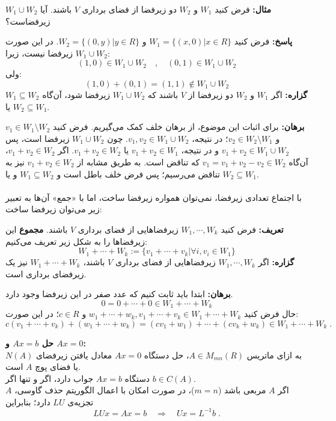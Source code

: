 \textbf{مثال:}
فرض کنید $W_{1}$ و $W_{2}$ دو زیر‌فضا از فضا‌ی برداری $V$ باشند. آیا $W_{1}\cup W_{2}$ زیر‌فضاست؟

\textbf{پاسخ:}
فرض کنید $W_{1} = \{(x,0)|x\in R\}$ و $W_{2} = \{(0,y)|y\in R\}$. در این صورت  $W_{1}\cup W_{2}$ زیر‌فضا نیست، زیرا:
$$(1,0)\in W_{1}\cup W_{2}\quad,\quad (0,1)\in W_{1}\cup W_{2}$$
ولی:
$$(1,0)+(0,1) = (1,1)\notin W_{1}\cup W_{2}$$
\textbf{گزاره:}
اگر $W_{1}$ و $W_{2}$ دو زیر‌فضا از $V$ باشند که  $W_{1}\cup W_{2}$ زیر‌فضا شود، آن‌گاه $W_{1}\subseteq W_{2}$ یا $W_{2}\subseteq W_{1}$.

\textbf{برهان:}
برای اثبات این موضوع، از برهان خلف کمک می‌گیریم. فرض کنید $v_{1}\in W_{1}\setminus W_{2}$ و $v_{2}\in W_{2}\setminus W_{1}$؛ در نتیجه، $v_{1},v_{2}\in W_{1}\cup W_{2}$. چون  $W_{1}\cup W_{2}$ زیر‌فضا است، پس $v_{1}+v_{2}\in W_{1}\cup W_{2}$ و در نتیجه، $v_{1} +v_{2}\in W_{1}$ یا $v_{1}+v_{2}\in W_{2}$. اگر $v_{1}+v_{2}\in W_{2}$، آن‌گاه $v_{1} = v_{1}+v_{2}-v_{2}\in W_{2}$ که تناقض است. به طریق مشابه از $v_{1}+v_{2}\in W_{2}$ نیز به تناقض می‌رسیم؛ پس فرض خلف باطل است و $W_{1}\subseteq W_{2}$ و یا $W_{2}\subseteq W_{1}$.\\\\
با اجتماع تعدادی زیر‌فضا، نمی‌توان همواره زیر‌فضا ساخت، اما با «جمع» آن‌ها به تعبیر زیر می‌توان زیر‌فضا ساخت:

\textbf{تعریف:}
فرض کنید $W_{1},\cdots,W_{k}$ زیر‌فضا‌هایی از فضا‌ی برداری $V$ باشند. \textbf{مجموع} این زیر‌فضاها را به شکل زیر تعریف می‌کنیم:
$$W_{1}+\cdots+W_{k}:=\{v_{1}+\cdots+v_{k}|\forall i ,v_{i}\in W_{1}\}$$
\textbf{گزاره:}
اگر $W_{1},\cdots,W_{k}$ زیر‌فضا‌هایی از فضا‌ی برداری $V$ باشند، $W_{1}+\cdots+W_{k}$ نیز یک زیر‌فضا‌ی برداری است.

\textbf{برهان:}
ابتدا باید ثابت کنیم که عدد صفر در این زیر‌فضا وجود دارد.
$$0=0+\cdots+0\in W_{1}+\cdots+W_{k}$$
حال فرض کنید $w_{1}+\cdots+w_{k},v_{1}+\cdots+v_{k}\in W_{1}+\cdots+W_{k}$ و $c\in R$؛ در این صورت:
$$c(v_{1}+\cdots+v_{k})+(w_{1}+\cdots+w_{k}) = (cv_{1}+w_{1})+\cdots+(cv_{k}+w_{k})\in W_{1}+\cdots+W_{k} \; .$$

\textbf{حل $Ax=b$ و $Ax=0$:}\\
به ازای ماتریس $A\in M_{mn}(R)$، حل دستگاه $Ax=0$ معادل یافتن زیر‌فضا‌ی $N(A)$ یا فضا‌ی پوچ $A$ است.\\
دستگاه $Ax=b$ جواب دارد، اگر و تنها اگر $b\in C(A)$.\\
اگر $A$ مربعی باشد ($m=n$)، در صورت امکان با اعمال الگوریتم حذف گاوسی، $A$ تجزیه‌ی $LU$ دارد؛ بنابراین 
$$LUx=Ax=b\quad\Rightarrow\quad Ux=L^{-1}b \; .$$


